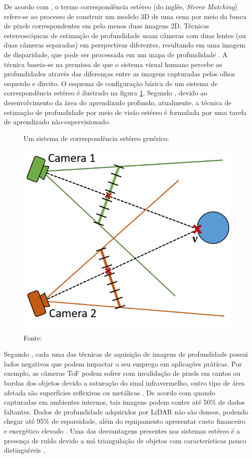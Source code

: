 De acordo com , o termo correspondência estéreo (do inglês, \textit{Stereo Matching}) refere-se ao processo de construir um modelo 3D de uma cena por meio da busca de pixels correspondentes em pelo menos duas imagens 2D. Técnicas estereoscópicas de estimação de profundidade usam câmeras com duas lentes (ou duas câmeras separadas) em perspectivas diferentes, resultando em uma imagem de disparidade, que pode ser processada em um mapa de profundidade \cite{castellano2023performance}. A técnica baseia-se na premissa de que o sistema visual humano percebe as profundidades através das diferenças entre as imagens capturadas pelos olhos esquerdo e direito. O esquema de configuração básica de um sistema de correspondência estéreo é ilustrado na figura \ref{fig:stereo}. Segundo , devido ao desenvolvimento da área do aprendizado profundo, atualmente, a técnica de estimação de profundidade por meio de visão estéreo é formulada por uma tarefa de aprendizado não-supervisionado.

\begin{figure}[h!]
    \centering
    \caption{Um sistema de correspondência estéreo genérico. }
    \includegraphics[width=.6\textwidth]{fig/stereo_cams.png}
    \caption*{Fonte: \cite{zollhofer2019commodity}}
    \label{fig:stereo}
\end{figure}

Segundo \cite{castellano2023performance}, cada uma das técnicas de aquisição de imagens de profundidade possui lados negativos que podem impactar o seu emprego em aplicações práticas. Por exemplo, as câmeras ToF  podem sofrer com invalidação de pixels em cantos ou bordas dos objetos devido a saturação do sinal infravermelho, outro tipo de área afetada são superfícies reflexivas ou metálicas \cite{zollhofer2019commodity}. De acordo com  quando capturadas em ambientes internos, tais imagens podem conter até 50\% de dados faltantes. Dados de profundidade adquiridos por LiDAR não são densos, podendo chegar até 95\% de esparsidade, além do equipamento apresentar custo financeiro e energético elevado \cite{khan2020deep} \cite{hu2022deep}. Uma das desvantagens presentes nos sistemas estéreo é a presença de ruído devido a má triangulação de objetos com características pouco distinguíveis \cite{castellano2023performance}.


